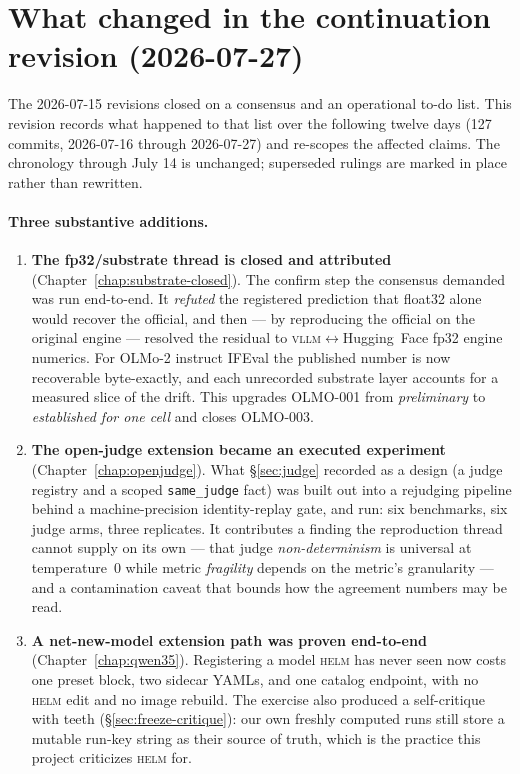 \documentclass[11pt]{report}
\newcommand{\code}[1]{\texttt{#1}}
\begin{document}
\section{What changed in the continuation revision (2026-07-27)}
\label{sec:rev-2026-07-27}

The 2026-07-15 revisions closed on a consensus and an operational to-do list. This
revision records what happened to that list over the following twelve days
(127 commits, 2026-07-16 through 2026-07-27) and re-scopes the affected claims. The
chronology through July 14 is unchanged; superseded rulings are marked in place
rather than rewritten.

\paragraph{Three substantive additions.}
\begin{enumerate}[nosep]
  \item \textbf{The fp32/substrate thread is closed and attributed}
        (Chapter~\ref{chap:substrate-closed}). The confirm step the consensus
        demanded was run end-to-end. It \emph{refuted} the registered prediction
        that float32 alone would recover the official, and then --- by reproducing
        the official on the original engine --- resolved the residual to
        \textsc{vllm}$\leftrightarrow$Hugging~Face fp32 engine numerics. For
        OLMo-2 instruct IFEval the published number is now recoverable
        byte-exactly, and each unrecorded substrate layer accounts for a measured
        slice of the drift. This upgrades OLMO-001 from \emph{preliminary} to
        \emph{established for one cell} and closes OLMO-003.
  \item \textbf{The open-judge extension became an executed experiment}
        (Chapter~\ref{chap:openjudge}). What \S\ref{sec:judge} recorded as a design
        (a judge registry and a scoped \code{same\_judge} fact) was built out into
        a rejudging pipeline behind a machine-precision identity-replay gate,
        and run: six benchmarks, six judge arms, three replicates. It contributes
        a finding the reproduction thread cannot supply on its own --- that judge
        \emph{non-determinism} is universal at temperature~0 while metric
        \emph{fragility} depends on the metric's granularity --- and a
        contamination caveat that bounds how the agreement numbers may be read.
  \item \textbf{A net-new-model extension path was proven end-to-end}
        (Chapter~\ref{chap:qwen35}). Registering a model \textsc{helm} has never
        seen now costs one preset block, two sidecar YAMLs, and one catalog
        endpoint, with no \textsc{helm} edit and no image rebuild. The exercise
        also produced a self-critique with teeth (\S\ref{sec:freeze-critique}):
        our own freshly computed runs still store a mutable run-key string as
        their source of truth, which is the practice this project criticizes
        \textsc{helm} for.
\end{enumerate}
\end{document}
